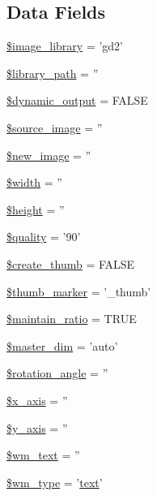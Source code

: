 \subsection*{Data Fields}
\begin{DoxyCompactItemize}
\item 
\hyperlink{class_c_i___image__lib_ac4b224358e1169eec8db344bcb3186c0}{\$image\-\_\-library} = 'gd2'
\item 
\hyperlink{class_c_i___image__lib_ac09f7fc802884aae2149f1df0e53f17a}{\$library\-\_\-path} = ''
\item 
\hyperlink{class_c_i___image__lib_ad90737913d82776e7d3a7dfaef68e167}{\$dynamic\-\_\-output} = F\-A\-L\-S\-E
\item 
\hyperlink{class_c_i___image__lib_a54fc395722d5e9f15d656d22ba84e382}{\$source\-\_\-image} = ''
\item 
\hyperlink{class_c_i___image__lib_a6147ac30032312f2b42a9b05618faf12}{\$new\-\_\-image} = ''
\item 
\hyperlink{class_c_i___image__lib_a5795120b4b324bc4ca83f1e6fdce7d57}{\$width} = ''
\item 
\hyperlink{class_c_i___image__lib_a2c265bba1724371bb03e6901297c30b2}{\$height} = ''
\item 
\hyperlink{class_c_i___image__lib_a0e342ea32cccdc2c932ad23b9796a62a}{\$quality} = '90'
\item 
\hyperlink{class_c_i___image__lib_ab1250903cbadaaadb42ec188d38ab398}{\$create\-\_\-thumb} = F\-A\-L\-S\-E
\item 
\hyperlink{class_c_i___image__lib_a3176700c651c0c3cd8cfa186ba03302a}{\$thumb\-\_\-marker} = '\-\_\-thumb'
\item 
\hyperlink{class_c_i___image__lib_a7fe1beb3e7d60245c97c60ee4b668d93}{\$maintain\-\_\-ratio} = T\-R\-U\-E
\item 
\hyperlink{class_c_i___image__lib_ae86c3d7ce316cc0c48a8dcba8ae4130d}{\$master\-\_\-dim} = 'auto'
\item 
\hyperlink{class_c_i___image__lib_a9410d2e216c0c1dd852031f2a39e7ec7}{\$rotation\-\_\-angle} = ''
\item 
\hyperlink{class_c_i___image__lib_a128914b11765a500690f876962196ca6}{\$x\-\_\-axis} = ''
\item 
\hyperlink{class_c_i___image__lib_ac60512307da37068c0821f7dc2488608}{\$y\-\_\-axis} = ''
\item 
\hyperlink{class_c_i___image__lib_a412eac22e8d585a33f28f132f13d482b}{\$wm\-\_\-text} = ''
\item 
\hyperlink{class_c_i___image__lib_a530808b613890909a92bf6096401e9be}{\$wm\-\_\-type} = '\hyperlink{mathquill_8js_afd670572c010bca545fd3952276dd249}{text}'

\end{DoxyCompactItemize}
